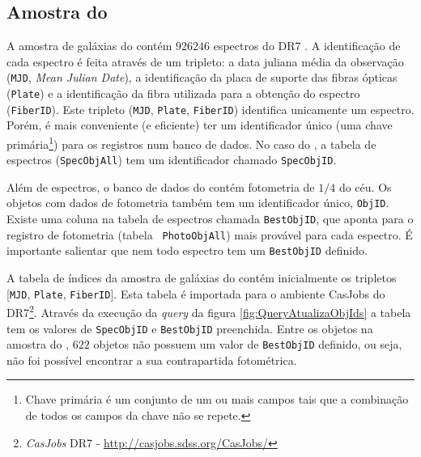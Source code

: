 \subsection{Amostra do \STARLIGHT}
\label{sec:Crossmatch:AmostraStarlight}

A amostra de galáxias do \starlight contém $926246$ espectros do \SDSS DR7
\citep{Abazajian2009}. A identificação de cada espectro é feita através de um
tripleto: a data juliana média da observação (\texttt{MJD}, {\em Mean Julian
Date}), a identificação da placa de suporte das fibras ópticas (\texttt{Plate})
e a identificação da fibra utilizada para a obtenção do espectro
(\texttt{FiberID}). Este tripleto (\texttt{MJD}, \texttt{Plate},
\texttt{FiberID}) identifica unicamente um espectro. Porém, é mais conveniente
(e eficiente) ter um identificador único (uma chave primária\footnote{Chave
primária é um conjunto de um ou mais campos tais que a combinação de todos os
campos da chave não se repete.}) para os registros num banco de dados. No caso
do \SDSS, a tabela de espectros (\texttt{SpecObjAll}) tem um identificador
chamado \texttt{SpecObjID}.

Além de espectros, o banco de dados do \SDSS contém fotometria de $1/4$ do céu.
Os objetos com dados de fotometria também tem um identificador único,
\texttt{ObjID}. Existe uma coluna na tabela de espectros chamada
\texttt{BestObjID}, que aponta para o registro de fotometria (tabela {\tt
PhotoObjAll}) mais provável para cada espectro. É importante salientar que nem
todo espectro tem um \texttt{BestObjID} definido.

A tabela de índices da amostra de galáxias do \starlight contém inicialmente os
tripletos [\texttt{MJD}, \texttt{Plate}, \texttt{FiberID}]. Esta tabela é
importada para o ambiente {CasJobs} do \SDSS DR7\footnote{{\em CasJobs} \SDSS
DR7 - \url{http://casjobs.sdss.org/CasJobs/}}. Através da execução da {\em
query} da figura \ref{fig:QueryAtualizaObjIds} a tabela tem os valores de
\texttt{SpecObjID} e \texttt{BestObjID} preenchida. Entre os objetos na amostra
do \starlight, $622$ objetos não possuem um valor de \texttt{BestObjID}
definido, ou seja, não foi possível encontrar a sua contrapartida fotométrica.



